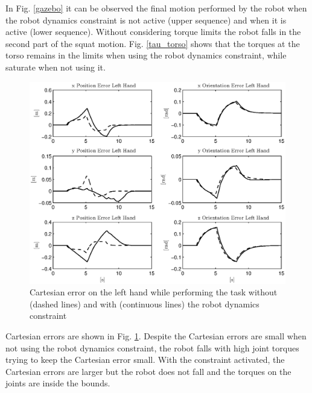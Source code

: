 In Fig. \ref{gazebo} it can be observed the final motion performed by the robot when the robot dynamics constraint is not active (upper sequence) and when it is active (lower sequence). Without considering torque limits the robot falls in the second part of the squat motion. Fig. \ref{tau_torso} shows that the torques at the torso remains in the limits when using the robot dynamics constraint, while saturate when not using it.

\begin{figure}[htb] 
\centering 
\includegraphics[width=\textwidth]{images/cartesian_error.eps} 
\caption{Cartesian error on the left hand while performing the task without (dashed lines) and with (continuous lines) the robot dynamics constraint} 
\label{cartesian_error}
\end{figure}

Cartesian errors are shown in Fig. \ref{cartesian_error}. Despite the Cartesian errors are small when not using the robot dynamics constraint, the robot falls with high joint torques trying to keep the Cartesian error small. With the constraint activated, the Cartesian errors are larger but the robot does not fall and the torques on the joints are inside the bounds. 

